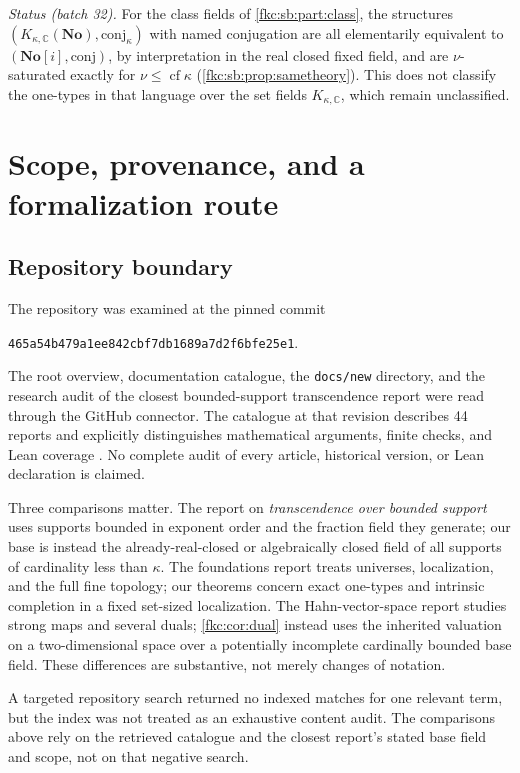 \documentclass[11pt,letterpaper]{article}
\numberwithin{equation}{section}
\theoremstyle{definition}
\theoremstyle{remark}
\newcommand{\C}{\mathbb C}
\newcommand{\No}{\mathbf{No}}
\newcommand{\cf}{\operatorname{cf}}
\newcommand{\KC}{K_{\kappa,\C}}
\newcommand{\repoid}{\texttt{465a54b479a1ee842cbf7db1689a7d2f6bfe25e1}}
\newcommand{\conj}{\mathrm{conj}}
\newcommand{\KN}[2]{K_{#1,#2}(\No)}%
\begin{document}
\emph{Status (batch 32).} For the class fields of \cref{fkc:sb:part:class}, the structures $(\KN\kappa\C,\conj_\kappa)$ with named conjugation are all elementarily equivalent to $(\No[i],\conj)$, by interpretation in the real closed fixed field, and are $\nu$-saturated exactly for $\nu\le\cf\kappa$ (\cref{fkc:sb:prop:sametheory}). This does not classify the one-types in that language over the set fields $\KC$, which remain unclassified.

\section{Scope, provenance, and a formalization route}
\label{fkc:sec:audit}

\subsection{Repository boundary}
The repository was examined at the pinned commit
\begin{center}\small\repoid.\end{center}
The root overview, documentation catalogue, the \texttt{docs/new} directory, and the research audit of the closest bounded-support transcendence report were read through the GitHub connector. The catalogue at that revision describes 44 reports and explicitly distinguishes mathematical arguments, finite checks, and Lean coverage \cite{Repo}. No complete audit of every article, historical version, or Lean declaration is claimed.

Three comparisons matter. The report on \emph{transcendence over bounded support} uses supports bounded in exponent order and the fraction field they generate; our base is instead the already-real-closed or algebraically closed field of all supports of cardinality less than $\kappa$. The foundations report treats universes, localization, and the full fine topology; our theorems concern exact one-types and intrinsic completion in a fixed set-sized localization. The Hahn-vector-space report studies strong maps and several duals; \cref{fkc:cor:dual} instead uses the inherited valuation on a two-dimensional space over a potentially incomplete cardinally bounded base field. These differences are substantive, not merely changes of notation.

A targeted repository search returned no indexed matches for one relevant term, but the index was not treated as an exhaustive content audit. The comparisons above rely on the retrieved catalogue and the closest report's stated base field and scope, not on that negative search.
\end{document}
